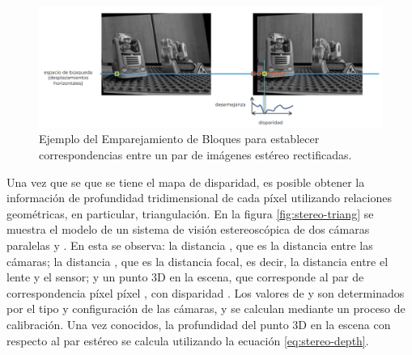 \begin{figure}[H]
    \centering
    \includegraphics[scale=0.4]{partes/ImgJoao/block-matching.png}
    \caption[Ejemplo del Emparejamiento de Bloques para establecer correspondencias entre un par de imágenes estéreo rectificadas.]{Ejemplo del Emparejamiento de Bloques para establecer correspondencias entre un par de imágenes estéreo rectificadas\footnotemark.} 
    \label{fig:stereo-block-matching}
\end{figure}

Una vez que se que se tiene el mapa de disparidad, es posible obtener la información de profundidad tridimensional de cada píxel utilizando relaciones geométricas, en particular, triangulación. En la figura \ref{fig:stereo-triang} se muestra el modelo de un sistema de visión estereoscópica de dos cámaras paralelas  y . En esta se observa: la distancia , que es la distancia entre las cámaras; la distancia , que es la distancia focal, es decir, la distancia entre el lente y el sensor; y un punto 3D en la escena, que corresponde al par de correspondencia píxel píxel ,  con disparidad . Los valores de  y  son determinados por el tipo y configuración de las cámaras, y se calculan mediante un proceso de calibración. Una vez conocidos, la profundidad  del punto 3D en la escena con respecto al par estéreo se calcula utilizando la ecuación \ref{eq:stereo-depth}. 

